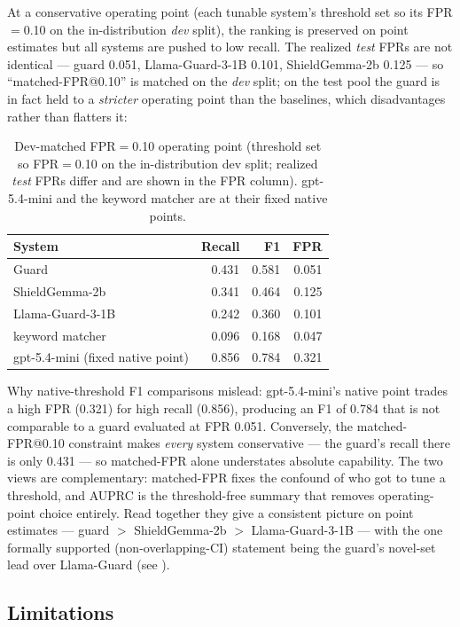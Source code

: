 \documentclass[sigconf,nonacm]{acmart}
\begin{document}
At a conservative operating point (each tunable system's threshold set so its FPR$=$0.10 on the in-distribution \emph{dev} split), the ranking is preserved on point estimates but all systems are pushed to low recall. The realized \emph{test} FPRs are not identical --- guard 0.051, Llama-Guard-3-1B 0.101, ShieldGemma-2b 0.125 --- so ``matched-FPR@0.10'' is matched on the \emph{dev} split; on the test pool the guard is in fact held to a \emph{stricter} operating point than the baselines, which disadvantages rather than flatters it:

\begin{table}[t]
\small
\centering
\caption{Dev-matched FPR$=$0.10 operating point (threshold set so FPR$=$0.10 on the in-distribution dev split; realized \emph{test} FPRs differ and are shown in the FPR column). gpt-5.4-mini and the keyword matcher are at their fixed native points.}
\label{tab:matched-fpr}
\begin{tabular}{lrrr}
\toprule
System & Recall & F1 & FPR \\
\midrule
Guard & 0.431 & 0.581 & 0.051 \\
ShieldGemma-2b & 0.341 & 0.464 & 0.125 \\
Llama-Guard-3-1B & 0.242 & 0.360 & 0.101 \\
keyword matcher & 0.096 & 0.168 & 0.047 \\
gpt-5.4-mini (fixed native point) & 0.856 & 0.784 & 0.321 \\
\bottomrule
\end{tabular}
\end{table}

Why native-threshold F1 comparisons mislead: gpt-5.4-mini's native point trades a high FPR (0.321) for high recall (0.856), producing an F1 of 0.784 that is not comparable to a guard evaluated at FPR 0.051. Conversely, the matched-FPR@0.10 constraint makes \emph{every} system conservative --- the guard's recall there is only 0.431 --- so matched-FPR alone understates absolute capability. The two views are complementary: matched-FPR fixes the confound of who got to tune a threshold, and AUPRC is the threshold-free summary that removes operating-point choice entirely. Read together they give a consistent picture on point estimates --- guard $>$ ShieldGemma-2b $>$ Llama-Guard-3-1B --- with the one formally supported (non-overlapping-CI) statement being the guard's novel-set lead over Llama-Guard (see ).

\subsection{Limitations}
\label{sec:limitations}
\end{document}
